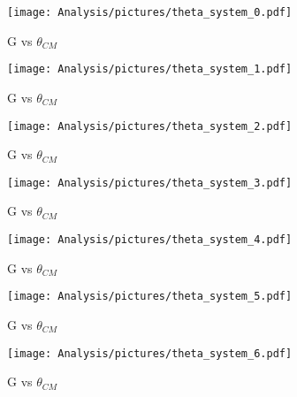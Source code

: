 \begin{figure}[htb]
  \begin{center}
    \texttt{[image: Analysis/pictures/theta\_system\_0.pdf]} \\
    \caption{G vs $\theta_{CM}$}
    \label{fig:Gvstheta_W1}
  \end{center}
\end{figure}
\begin{figure}[htb]
  \begin{center}
    \texttt{[image: Analysis/pictures/theta\_system\_1.pdf]} \\
    \caption{G vs $\theta_{CM}$ }
    \label{fig:Gvstheta_W2}
  \end{center}
\end{figure}
\begin{figure}[htb]
  \begin{center}
    \texttt{[image: Analysis/pictures/theta\_system\_2.pdf]} \\
    \caption{G vs $\theta_{CM}$ }
    \label{fig:Gvstheta_W3}
  \end{center}
\end{figure}
\begin{figure}[htb]
  \begin{center}
    \texttt{[image: Analysis/pictures/theta\_system\_3.pdf]} \\
    \caption{G vs $\theta_{CM}$ }
    \label{fig:Gvstheta_W4}
  \end{center}
\end{figure}
\begin{figure}[htb]
  \begin{center}
    \texttt{[image: Analysis/pictures/theta\_system\_4.pdf]} \\
    \caption{G vs $\theta_{CM}$ }
    \label{fig:Gvstheta_W5}
  \end{center}
\end{figure}
\begin{figure}[htb]
  \begin{center}
    \texttt{[image: Analysis/pictures/theta\_system\_5.pdf]} \\
    \caption{G vs $\theta_{CM}$}
    \label{fig:Gvstheta_W6}
  \end{center}
\end{figure}
\begin{figure}[htb]
  \begin{center}
    \texttt{[image: Analysis/pictures/theta\_system\_6.pdf]} \\
    \caption{G vs $\theta_{CM}$ }
    \label{fig:Gvstheta_W7}
  \end{center}
\end{figure}

